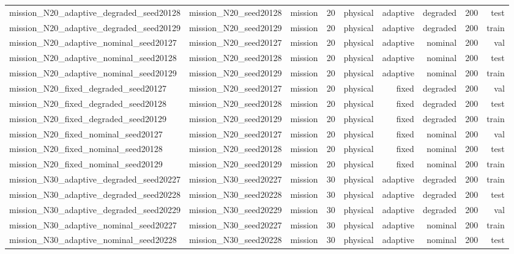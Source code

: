 \begin{tabular}{lrrrrrrrr}
mission\_N20\_adaptive\_degraded\_seed20128 & mission\_N20\_seed20128 & mission & 20 & physical & adaptive & degraded & 200 & test \\
mission\_N20\_adaptive\_degraded\_seed20129 & mission\_N20\_seed20129 & mission & 20 & physical & adaptive & degraded & 200 & train \\
mission\_N20\_adaptive\_nominal\_seed20127 & mission\_N20\_seed20127 & mission & 20 & physical & adaptive & nominal & 200 & val \\
mission\_N20\_adaptive\_nominal\_seed20128 & mission\_N20\_seed20128 & mission & 20 & physical & adaptive & nominal & 200 & test \\
mission\_N20\_adaptive\_nominal\_seed20129 & mission\_N20\_seed20129 & mission & 20 & physical & adaptive & nominal & 200 & train \\
mission\_N20\_fixed\_degraded\_seed20127 & mission\_N20\_seed20127 & mission & 20 & physical & fixed & degraded & 200 & val \\
mission\_N20\_fixed\_degraded\_seed20128 & mission\_N20\_seed20128 & mission & 20 & physical & fixed & degraded & 200 & test \\
mission\_N20\_fixed\_degraded\_seed20129 & mission\_N20\_seed20129 & mission & 20 & physical & fixed & degraded & 200 & train \\
mission\_N20\_fixed\_nominal\_seed20127 & mission\_N20\_seed20127 & mission & 20 & physical & fixed & nominal & 200 & val \\
mission\_N20\_fixed\_nominal\_seed20128 & mission\_N20\_seed20128 & mission & 20 & physical & fixed & nominal & 200 & test \\
mission\_N20\_fixed\_nominal\_seed20129 & mission\_N20\_seed20129 & mission & 20 & physical & fixed & nominal & 200 & train \\
mission\_N30\_adaptive\_degraded\_seed20227 & mission\_N30\_seed20227 & mission & 30 & physical & adaptive & degraded & 200 & train \\
mission\_N30\_adaptive\_degraded\_seed20228 & mission\_N30\_seed20228 & mission & 30 & physical & adaptive & degraded & 200 & test \\
mission\_N30\_adaptive\_degraded\_seed20229 & mission\_N30\_seed20229 & mission & 30 & physical & adaptive & degraded & 200 & val \\
mission\_N30\_adaptive\_nominal\_seed20227 & mission\_N30\_seed20227 & mission & 30 & physical & adaptive & nominal & 200 & train \\
mission\_N30\_adaptive\_nominal\_seed20228 & mission\_N30\_seed20228 & mission & 30 & physical & adaptive & nominal & 200 & test \\

\end{tabular}
